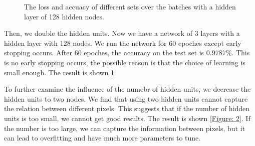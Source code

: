 \documentclass{article} %
\begin{document}
\begin{figure} [!htbp]
	
	\caption{The loss and accuacy of different sets over the batches with a hidden layer of 128 hidden nodes. }  
	 \label{Figure: 128}
\end{figure}

Then, we double the hidden units. Now we have a network of 3 layers with a hidden layer with 128 nodes. We run the network for 60 epoches except early stopping occurs. After 60 epoches, the accuracy on the test set is 0.9787\%. This is no early stopping occurs, the possible reason is that the choice of learning is small enough. The result is shown \ref{Figure: 128}


To further examine the influence of the numebr of hidden units, we decrease the hidden units to two nodes. We find that using two hidden units cannot capture the relation between different pixels. This suggests that if the number of
hidden units is too small, we cannot get good results. The result is shown \ref{Figure: 2}. If the number is too large, we can capture the information between pixels, but it can lead to overfitting and have much more parameters to tune.
\end{document}
